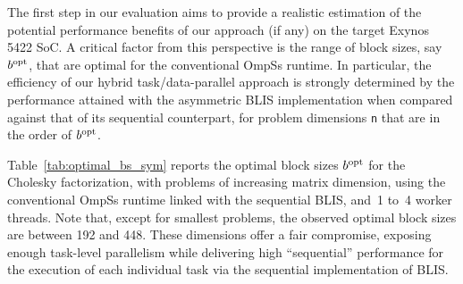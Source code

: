 \newcommand{\bopt}{b^{\mbox{\rm \scriptsize opt}}\xspace}

The first step in our evaluation aims to provide a realistic estimation of the potential performance benefits
of our approach (if any) on the target Exynos 5422 SoC. 
A critical factor from this perspective is the range of block sizes, say $\bopt$,
that are optimal for the conventional OmpSs runtime. In particular, the efficiency 
of our hybrid task/data-parallel approach is strongly determined by the performance 
attained with the asymmetric BLIS implementation when compared against that of its sequential counterpart,
for problem dimensions {\tt n} that are in the order of $\bopt$.

Table~\ref{tab:optimal_bs_sym} reports the optimal block sizes $\bopt$ 
for the Cholesky factorization, with problems of increasing matrix dimension, using the conventional
OmpSs runtime linked with the sequential BLIS, and~1 to~4 worker threads.
Note that, except for smallest problems, the observed optimal block sizes
are between 192 and 448. These dimensions offer a 
fair compromise, exposing enough task-level parallelism
while delivering high ``sequential'' performance for the execution of each individual task
via the sequential implementation of BLIS.

%

